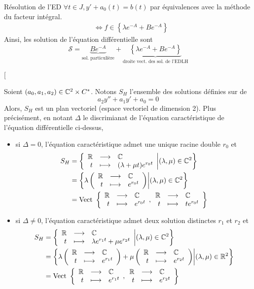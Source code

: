 \documentclass{article}
\begin{document}
\begin{question_kholle}{Résolution de l'ED  $\forall t \in J, y' + a_{0}(t) = b(t)$ par équivalences avec la méthode du facteur intégral.}
\begin{align*}
                                                                                                                          & \iff f\in \left\{\lambda e^{-A}+B e^{-A}\right\}
  \end{align*}
  Ainsi, les solution de l’équation différentielle sont
  \[
    \mathcal{S}=\underbrace{B e^{-A}}_{\text{sol. particulière}} + \underbrace{\left\{\lambda e^{-A}+B e^{-A}\right\}}_{\text{droite vect. des sol. de l'EDLH}}
  \]
\end{question_kholle}

\begin{question_kholle}[{
  Soient \((a_{0}, a_{1}, a_{2})\in\mathbb C^2\times C^*\). Notons \(S_H\) l’ensemble des solutions définies sur \R de
  \[
    a_{2}y''+a_{1}y' + a_{0}=0
  \]
  Alors, $S_{H}$ est un plan vectoriel (espace vectoriel de dimension 2). Plus précisément, en notant $\Delta$ le discrimianat de l'équation caractéristique de l'équation différentielle ci-dessus,
  \begin{itemize}[label=$\star$]
    \item si $\Delta=0$, l'équation caractéristique admet une unique racine double $r_{0}$ et
          \begin{align*}
            S_{H} & =\left\{\begin{array}{rcl} \mathbb R & \longrightarrow & \mathbb C \\ t & \longmapsto & (\lambda+\mu t)e^{r_{0}t} \end{array} \middle| (\lambda, \mu)\in\mathbb C^{2}\right\}        \\
                  & = \left\{\lambda \left(\begin{array}{rcl} \mathbb R & \longrightarrow & \mathbb C \\ t & \longmapsto & e^{r_{0}t} \end{array}\right) \middle| (\lambda, \mu)\in\mathbb C^{2}\right\} \\
                  & =  \text{Vect } \left\{\begin{array}{rcl} \mathbb R & \longrightarrow & \mathbb C \\ t & \longmapsto & e^{r_{0}t} \end{array}, \begin{array}{rcl} \mathbb R & \longrightarrow & \mathbb C \\ t & \longmapsto & t e^{r_{0}t} \end{array}\right\}
          \end{align*}
    \item si $\Delta\neq 0$, l’équation caractéristique admet deux solution distinctes $r_{1}$ et $r_{2}$ et
          \begin{align*}
            S_{H} & = \left\{\begin{array}{rcl} \mathbb R & \longrightarrow & \mathbb C \\ t & \longmapsto & \lambda e^{r_{1}t} + \mu e^{r_{2}t} \end{array} \middle| (\lambda, \mu)\in\mathbb C^{2}\right\}                                              \\
                  & = \left\{\lambda\left(\begin{array}{rcl} \mathbb R & \longrightarrow & \mathbb C \\ t & \longmapsto & e^{r_{1}t} \end{array}\right) + \mu \left(\begin{array}{rcl} \mathbb R & \longrightarrow & \mathbb C \\ t & \longmapsto & e^{r_{2}t} \end{array}\right) \middle| (\lambda, \mu)\in\mathbb R^{2}\right\} \\
                  & = \text{Vect } \left\{\begin{array}{rcl} \mathbb R & \longrightarrow & \mathbb C \\ t & \longmapsto & e^{r_{1}t} \end{array}, \begin{array}{rcl} \mathbb R & \longrightarrow & \mathbb C \\ t & \longmapsto & e^{r_{2}t} \end{array}\right\}
          \end{align*}
  \end{itemize}
}
\end{question_kholle}
\end{document}
